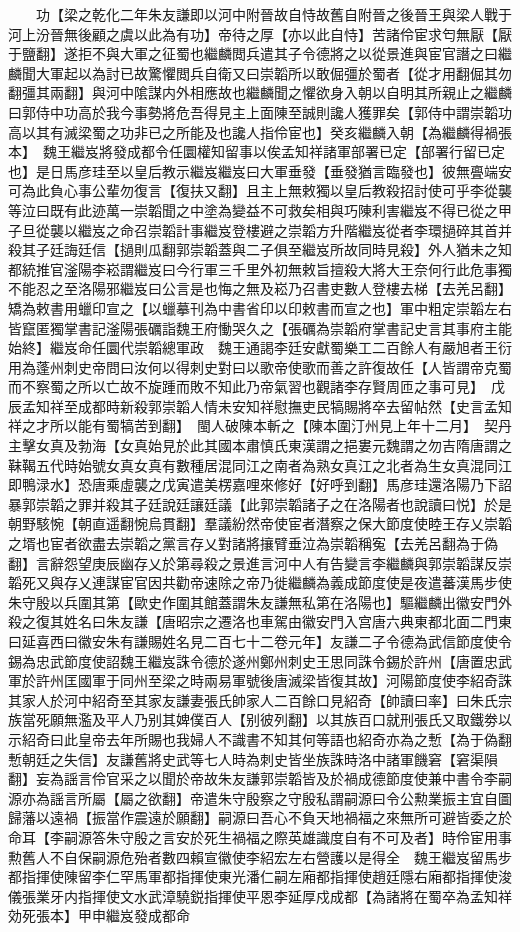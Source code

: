　　功【梁之乾化二年朱友謙即以河中附晉故自恃故舊自附晉之後晉王與梁人戰于河上汾晉無後顧之虞以此為有功】帝待之厚【亦以此自恃】苦諸伶宦求匄無厭【厭于鹽翻】遂拒不與大軍之征蜀也繼麟閲兵遣其子令德將之以從景進與宦官譖之曰繼麟聞大軍起以為討已故驚懼閲兵自衛又曰崇韜所以敢倔彊於蜀者【從才用翻倔其勿翻彊其兩翻】與河中隂謀内外相應故也繼麟聞之懼欲身入朝以自明其所親止之繼麟曰郭侍中功高於我今事勢將危吾得見主上面陳至誠則讒人獲罪矣【郭侍中謂崇韜功高以其有滅梁蜀之功非已之所能及也讒人指伶宦也】癸亥繼麟入朝【為繼麟得禍張本】　魏王繼岌將發成都令任圜權知留事以俟孟知祥諸軍部署已定【部署行留已定也】是日馬彦珪至以皇后教示繼岌繼岌曰大軍垂發【垂發猶言臨發也】彼無亹端安可為此負心事公輩勿復言【復扶又翻】且主上無敕獨以皇后教殺招討使可乎李從襲等泣曰既有此迹萬一崇韜聞之中塗為變益不可救矣相與巧陳利害繼岌不得已從之甲子旦從襲以繼岌之命召崇韜計事繼岌登樓避之崇韜方升階繼岌從者李環撾碎其首并殺其子廷誨廷信【撾則瓜翻郭崇韜蓋與二子俱至繼岌所故同時見殺】外人猶未之知都統推官滏陽李崧謂繼岌曰今行軍三千里外初無敕旨擅殺大將大王奈何行此危事獨不能忍之至洛陽邪繼岌曰公言是也悔之無及崧乃召書吏數人登樓去梯【去羌呂翻】矯為敕書用蠟印宣之【以蠟摹刊為中書省印以印敕書而宣之也】軍中粗定崇韜左右皆竄匿獨掌書記滏陽張礪詣魏王府慟哭久之【張礪為崇韜府掌書記史言其事府主能始終】繼岌命任圜代崇韜總軍政　魏王通謁李廷安獻蜀樂工二百餘人有嚴旭者王衍用為蓬州刺史帝問曰汝何以得刺史對曰以歌帝使歌而善之許復故任【人皆謂帝克蜀而不察蜀之所以亡故不旋踵而敗不知此乃帝氣習也觀諸李存賢周匝之事可見】　戊辰孟知祥至成都時新殺郭崇韜人情未安知祥慰撫吏民犒賜將卒去留帖然【史言孟知祥之才所以能有蜀犒苦到翻】　閩人破陳本斬之【陳本圍汀州見上年十二月】　契丹主擊女真及勃海【女真始見於此其國本肅慎氏東漢謂之挹婁元魏謂之勿吉隋唐謂之靺鞨五代時始號女真女真有數種居混同江之南者為熟女真江之北者為生女真混同江即鴨渌水】恐唐乘虛襲之戊寅遣美楞嘉哩來修好【好呼到翻】馬彦珪還洛陽乃下詔暴郭崇韜之罪并殺其子廷說廷讓廷議【此郭崇韜諸子之在洛陽者也說讀曰悦】於是朝野駭惋【朝直遥翻惋烏貫翻】羣議紛然帝使宦者潛察之保大節度使睦王存乂崇韜之壻也宦者欲盡去崇韜之黨言存乂對諸將攘臂垂泣為崇韜稱寃【去羌呂翻為于偽翻】言辭怨望庚辰幽存乂於第尋殺之景進言河中人有告變言李繼麟與郭崇韜謀反崇韜死又與存乂連謀宦官因共勸帝速除之帝乃徙繼麟為義成節度使是夜遣蕃漢馬步使朱守殷以兵圍其第【歐史作圍其館蓋謂朱友謙無私第在洛陽也】驅繼麟出徽安門外殺之復其姓名曰朱友謙【唐昭宗之遷洛也車駕由徽安門入宫唐六典東都北面二門東曰延喜西曰徽安朱有謙賜姓名見二百七十二卷元年】友謙二子令德為武信節度使令錫為忠武節度使詔魏王繼岌誅令德於遂州鄭州刺史王思同誅令錫於許州【唐置忠武軍於許州匡國軍于同州至梁之時兩易軍號後唐滅梁皆復其故】河陽節度使李紹奇誅其家人於河中紹奇至其家友謙妻張氏帥家人二百餘口見紹奇【帥讀曰率】曰朱氏宗族當死願無濫及平人乃别其婢僕百人【别彼列翻】以其族百口就刑張氏又取鐵劵以示紹奇曰此皇帝去年所賜也我婦人不識書不知其何等語也紹奇亦為之慙【為于偽翻慙朝廷之失信】友謙舊將史武等七人時為刺史皆坐族誅時洛中諸軍饑窘【窘渠隕翻】妄為謡言伶官采之以聞於帝故朱友謙郭崇韜皆及於禍成德節度使兼中書令李嗣源亦為謡言所屬【屬之欲翻】帝遣朱守殷察之守殷私謂嗣源曰令公勲業振主宜自圖歸藩以遠禍【振當作震遠於願翻】嗣源曰吾心不負天地禍福之來無所可避皆委之於命耳【李嗣源答朱守殷之言安於死生禍福之際英雄識度自有不可及者】時伶宦用事勲舊人不自保嗣源危殆者數四賴宣徽使李紹宏左右營護以是得全　魏王繼岌留馬步都指揮使陳留李仁罕馬軍都指揮使東光潘仁嗣左廂都指揮使趙廷隱右廂都指揮使浚儀張業牙内指揮使文水武漳驍鋭指揮使平恩李延厚戍成都【為諸將在蜀卒為孟知祥効死張本】甲申繼岌發成都命